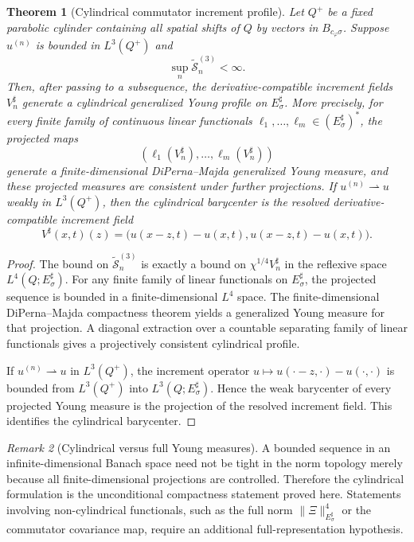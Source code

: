 \documentclass[11pt]{article}
\numberwithin{equation}{section}
\theoremstyle{plain}
\newtheorem{theorem}{Theorem}[section]
\theoremstyle{definition}
\theoremstyle{remark}
\newtheorem{remark}[theorem]{Remark}
\begin{document}
\begin{theorem}[Cylindrical commutator increment profile]\label{thm:young-extraction}
Let $Q^+$ be a fixed parabolic cylinder containing all spatial shifts of $Q$ by vectors in $B_{c_\varphi\sigma}$.  Suppose $u^{(n)}$ is bounded in $L^3(Q^+)$ and
\[
\sup_n\widetilde{\mathcal S}^{(3)}_n<\infty.
\]
Then, after passing to a subsequence, the derivative-compatible increment fields $V^\sharp_n$ generate a cylindrical generalized Young profile on $E^\sharp_\sigma$.  More precisely, for every finite family of continuous linear functionals $\ell_1,\dots,\ell_m\in(E^\sharp_\sigma)^*$, the projected maps
\[
(\ell_1(V^\sharp_n),\dots,\ell_m(V^\sharp_n))
\]
generate a finite-dimensional DiPerna--Majda generalized Young measure, and these projected measures are consistent under further projections.  If $u^{(n)}\rightharpoonup u$ weakly in $L^3(Q^+)$, then the cylindrical barycenter is the resolved derivative-compatible increment field
\[
V^\sharp(x,t)(z)=\bigl(u(x-z,t)-u(x,t),u(x-z,t)-u(x,t)\bigr).
\]
\end{theorem}

\begin{proof}
The bound on $\widetilde{\mathcal S}^{(3)}_n$ is exactly a bound on $\chi^{1/4}V^\sharp_n$ in the reflexive space $L^4(Q;E^\sharp_\sigma)$.  For any finite family of linear functionals on $E^\sharp_\sigma$, the projected sequence is bounded in a finite-dimensional $L^4$ space.  The finite-dimensional DiPerna--Majda compactness theorem yields a generalized Young measure for that projection.  A diagonal extraction over a countable separating family of linear functionals gives a projectively consistent cylindrical profile.

If $u^{(n)}\rightharpoonup u$ in $L^3(Q^+)$, the increment operator $u\mapsto u(\cdot-z,\cdot)-u(\cdot,\cdot)$ is bounded from $L^3(Q^+)$ into $L^3(Q;E^\sharp_\sigma)$.  Hence the weak barycenter of every projected Young measure is the projection of the resolved increment field.  This identifies the cylindrical barycenter.
\end{proof}

\begin{remark}[Cylindrical versus full Young measures]\label{rem:cylindrical-vs-full}
A bounded sequence in an infinite-dimensional Banach space need not be tight in the norm topology merely because all finite-dimensional projections are controlled.  Therefore the cylindrical formulation is the unconditional compactness statement proved here.  Statements involving non-cylindrical functionals, such as the full norm $\|\Xi\|_{E^\sharp_\sigma}^{4}$ or the commutator covariance map, require an additional full-representation hypothesis.
\end{remark}
\end{document}
